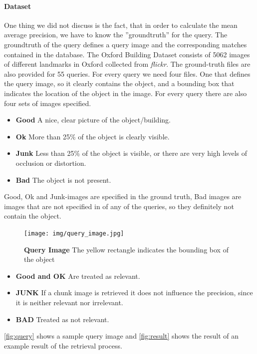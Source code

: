 \documentclass[10pt,a4paper]{article}
\begin{document}
\paragraph{Dataset}
One thing we did not discuss is the fact, that in order to calculate the mean average precision, we have to know the ''groundtruth'' for the query. The groundtruth of the query defines a query image and the corresponding matches contained in the database. The Oxford Building Dataset consists of 5062 images of different landmarks in Oxford collected from \textit{flickr}. The ground-truth files are also provided for 55 queries. For every query we need four files. One that defines the query image, so it clearly contains the object, and a bounding box that indicates the location of the object in the image. For every query there are also four sets of images specified.
\begin{itemize}
	\item \textbf{Good}  A nice, clear picture of the object/building.
	\item \textbf{Ok} More than 25\% of the object is clearly visible. 
	\item \textbf{Junk} Less than 25\% of the object is visible, or there are very high levels of occlusion or distortion. 
	\item \textbf{Bad} The object is not present. 
\end{itemize}
Good, Ok and Junk-images are specified in the ground truth, Bad images are images that are not specified in of any of the queries, so they definitely not contain the object.
\begin{figure}
	\texttt{[image: img/query\_image.jpg]} 
	\caption{\textbf{Query Image} The yellow rectangle indicates the bounding box of the object}
	\label{fig:query}
\end{figure}
\begin{itemize}
	\item \textbf{Good and OK} Are treated as relevant.
	\item \textbf{JUNK} If a chunk image is retrieved it does not influence the precision, since it is neither relevant nor irrelevant.
	\item \textbf{BAD} Treated as not relevant.
\end{itemize}
\autoref{fig:query} shows a sample query image and \autoref{fig:result} shows the result of an example result of the retrieval process.
\end{document}
